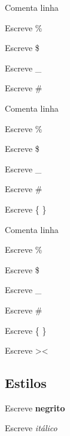 \begin{frame}
	\begin{description}[maiortextodomundoqueconsigoes]
		\item [{\code \%}]    Comenta linha
		\item [{\code \textbackslash \%}]    Escreve \%
		\item [{\code \textbackslash \$}]    Escreve \$
		\item [{\code \textbackslash \_}]    Escreve \_
		\item [{\code \textbackslash \#}]    Escreve \#
	\end{description}
\end{frame}

\begin{frame}
	\begin{description}[maiortextodomundoqueconsigoes]
		\item [{\code \%}]    Comenta linha
		\item [{\code \textbackslash \%}]    Escreve \%
		\item [{\code \textbackslash \$}]    Escreve \$
		\item [{\code \textbackslash \_}]    Escreve \_
		\item [{\code \textbackslash \#}]    Escreve \#
		\item [{\code \textbackslash \{ \}}]    Escreve \{ \}
	\end{description}
\end{frame}

\begin{frame}
	\begin{description}[maiortextodomundoqueconsigoes]
		\item [{\code \%}]    Comenta linha
		\item [{\code \textbackslash \%}]    Escreve \%
		\item [{\code \textbackslash \$}]    Escreve \$
		\item [{\code \textbackslash \_}]    Escreve \_
		\item [{\code \textbackslash \#}]    Escreve \#
		\item [{\code \textbackslash \{ \}}]    Escreve \{ \}
		\item [{\code ><}]    Escreve ><
	\end{description}
\end{frame}

\subsection{Estilos} %
\label{sub:tamanhos}
\begin{frame}
	\begin{description}[maiortextodomundoqueconsigoes]
		\item [{\code \textbackslash textbf\{negrito\}}]    Escreve \textbf{negrito}
		\item [{\code \textbackslash textit\{itálico\}}]    Escreve \textit{itálico}
	\end{description}
\end{frame}

